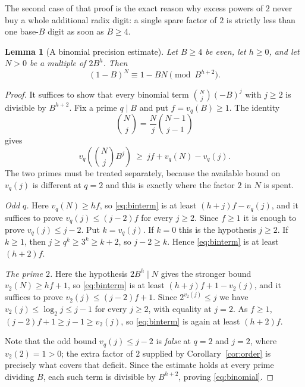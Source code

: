 \documentclass[11pt,letterpaper]{article}
\numberwithin{equation}{section}
\newtheorem{lemma}[theorem]{Lemma}
\theoremstyle{definition}
\theoremstyle{remark}
\begin{document}
The second case of that proof is the exact reason why excess powers of $2$ never buy a whole additional radix digit: a single spare factor of $2$ is strictly less than one base-$B$ digit as soon as $B\ge4$.

\begin{lemma}[A binomial precision estimate]\label{lem:binomial}
Let $B\ge4$ be even, let $h\ge0$, and let $N>0$ be a multiple of $2B^h$. Then
\begin{equation}\label{eq:binomial}
 (1-B)^N\equiv1-BN\pmod{B^{h+2}}.
\end{equation}
\end{lemma}
\begin{proof}
It suffices to show that every binomial term $\binom Nj(-B)^j$ with $j\ge2$ is divisible by $B^{h+2}$. Fix a prime $q\mid B$ and put $f=v_q(B)\ge1$. The identity
\[
 \binom Nj=\frac Nj\binom{N-1}{j-1}
\]
gives
\begin{equation}\label{eq:binterm}
 v_q\!\left(\binom Nj B^j\right)\ \ge\ jf+v_q(N)-v_q(j).
\end{equation}
The two primes must be treated separately, because the available bound on $v_q(j)$ is different at $q=2$ and this is exactly where the factor $2$ in $N$ is spent.

\emph{Odd $q$.} Here $v_q(N)\ge hf$, so \eqref{eq:binterm} is at least $(h+j)f-v_q(j)$, and it suffices to prove $v_q(j)\le(j-2)f$ for every $j\ge2$. Since $f\ge1$ it is enough to prove $v_q(j)\le j-2$. Put $k=v_q(j)$. If $k=0$ this is the hypothesis $j\ge2$. If $k\ge1$, then $j\ge q^k\ge3^k\ge k+2$, so $j-2\ge k$. Hence \eqref{eq:binterm} is at least $(h+2)f$.

\emph{The prime $2$.} Here the hypothesis $2B^h\mid N$ gives the stronger bound $v_2(N)\ge hf+1$, so \eqref{eq:binterm} is at least $(h+j)f+1-v_2(j)$, and it suffices to prove $v_2(j)\le(j-2)f+1$. Since $2^{v_2(j)}\le j$ we have $v_2(j)\le\log_2 j\le j-1$ for every $j\ge2$, with equality at $j=2$. As $f\ge1$, $(j-2)f+1\ge j-1\ge v_2(j)$, so \eqref{eq:binterm} is again at least $(h+2)f$.

Note that the odd bound $v_q(j)\le j-2$ is \emph{false} at $q=2$ and $j=2$, where $v_2(2)=1>0$; the extra factor of $2$ supplied by Corollary~\ref{cor:order} is precisely what covers that deficit. Since the estimate holds at every prime dividing $B$, each such term is divisible by $B^{h+2}$, proving \eqref{eq:binomial}.
\end{proof}
\end{document}
